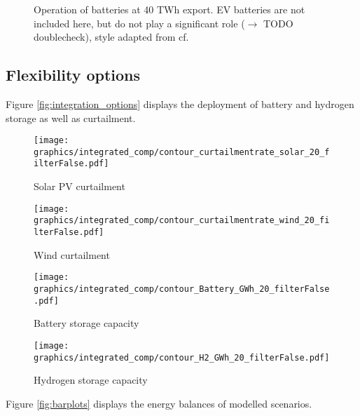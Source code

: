 \begin{figure}
    \caption{Operation of batteries at 40 TWh export. EV batteries are not included here, but do not play a significant role ($\rightarrow$ TODO doublecheck), style adapted from cf. \cite{Neumann2022}}
    \label{fig:battery_operation}
\end{figure}

\clearpage
\twocolumn



\subsection{Flexibility options}
Figure \ref{fig:integration_options} displays the deployment of battery and hydrogen storage as well as curtailment.

\begin{figure*}[t] %
    \centering
    \begin{subfigure}[b]{0.45\linewidth}
        \centering
        \texttt{[image: graphics/integrated\_comp/contour\_curtailmentrate\_solar\_20\_filterFalse.pdf]}
        \caption{Solar PV curtailment}
        \label{fig:solar_curt}
    \end{subfigure}
    \hfill
    \begin{subfigure}[b]{0.45\linewidth}
        \centering
        \texttt{[image: graphics/integrated\_comp/contour\_curtailmentrate\_wind\_20\_filterFalse.pdf]}
        \caption{Wind curtailment}
        \label{fig:wind_curt}
    \end{subfigure}
    \hfill
    \begin{subfigure}[b]{0.45\linewidth}
        \centering
        \texttt{[image: graphics/integrated\_comp/contour\_Battery\_GWh\_20\_filterFalse.pdf]}
        \caption{Battery storage capacity}
        \label{fig:battery_cap}
    \end{subfigure}
    \hfill
    \begin{subfigure}[b]{0.45\linewidth}
        \centering
        \texttt{[image: graphics/integrated\_comp/contour\_H2\_GWh\_20\_filterFalse.pdf]}
        \caption{Hydrogen storage capacity}
        \label{fig:hystorage_cap}
    \end{subfigure}
    \hfill

    \caption{Curtailment rates and storage capacities}
    \label{fig:integration_options}
\end{figure*}

Figure \ref{fig:barplots} displays the energy balances of modelled scenarios.


